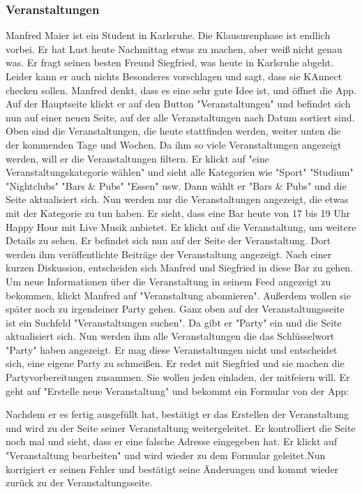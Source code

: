 \documentclass[parskip=full]{scrartcl}
\begin{document}
	\subsubsection{Veranstaltungen}
	Manfred Maier ist ein Student in Karlsruhe. Die Klausurenphase ist endlich vorbei. Er hat Lust heute Nachmittag etwas zu machen, aber weiß nicht genau was. Er fragt seinen besten Freund Siegfried, was heute in Karlsruhe abgeht. Leider kann er auch nichts Besonderes vorschlagen und sagt, dass sie KAnnect checken sollen. Manfred denkt, dass es eine sehr gute Idee ist, und öffnet die \gls{App}.
	Auf der Hauptseite klickt er auf den \gls{Button} "Veranstaltungen" und befindet sich nun auf einer neuen Seite, auf der alle Veranstaltungen nach Datum sortiert sind. Oben sind die Veranstaltungen, die heute stattfinden werden, weiter unten die der kommenden Tage und Wochen.
	Da ihm so viele Veranstaltungen angezeigt werden, will er die Veranstaltungen filtern. Er klickt auf "eine Veranstaltungskategorie wählen" und sieht alle \gls{Kategorie}n wie "Sport" "Studium" "Nightclubs" "Bars \& Pubs" "Essen" usw. 
	Dann wählt er "Bars \& Pubs" und die Seite aktualisiert sich. Nun werden nur die Veranstaltungen angezeigt, die etwas mit der \gls{Kategorie} zu tun haben.
	Er sieht, dass eine Bar heute von 17 bis 19 Uhr Happy Hour mit Live Musik anbietet. Er klickt auf die Veranstaltung, um weitere Details zu sehen. Er befindet sich nun auf der Seite der Veranstaltung. Dort werden ihm veröffentlichte Beiträge der Veranstaltung angezeigt. Nach einer kurzen Diskussion, entscheiden sich Manfred und Siegfried in diese Bar zu gehen. Um neue Informationen über die Veranstaltung in seinem \gls{Feed} angezeigt zu bekommen, klickt Manfred auf "Veranstaltung abonnieren". Außerdem wollen sie später noch zu irgendeiner Party gehen. Ganz oben auf der Veranstaltungsseite ist ein Suchfeld "Veranstaltungen suchen". Da gibt er "Party" ein und die Seite aktualisiert sich. Nun werden ihm alle Veranstaltungen die das Schlüsselwort "Party" haben angezeigt. Er mag diese Veranstaltungen nicht und entscheidet sich, eine eigene Party zu schmeißen. Er redet mit Siegfried und sie machen die Partyvorbereitungen zusammen. Sie wollen jeden einladen, der mitfeiern will. Er geht auf "Erstelle neue Veranstaltung" und bekommt ein Formular von der \gls{App}: 
	
	
	Nachdem er es fertig ausgefüllt hat, bestätigt er das Erstellen der Veranstaltung und wird zu der Seite seiner Veranstaltung weitergeleitet. Er kontrolliert die Seite noch mal und sieht, dass er eine falsche Adresse eingegeben hat. Er klickt auf "Veranstaltung bearbeiten" und wird wieder zu dem Formular geleitet.Nun korrigiert er seinen Fehler und bestätigt seine Änderungen und kommt wieder zurück zu der Veranstaltungsseite.
	
\end{document}
